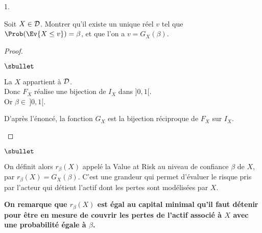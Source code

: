\documentclass[11pt]{article}%
\begin{document}
\begin{noliste}{1.}
  \setlength{\itemsep}{4mm}
  \item Soit $X \in {\cal D}$. Montrer qu'il existe un unique réel 
  $v$ tel que $\Prob(\Ev{X \leq v})=\beta$, et que l'on a 
  $v=G_X(\beta)$.
  
  \begin{proof}~
    \begin{noliste}{$\sbullet$}
      \item La \var $X$ appartient à ${\cal D}$.\\
      Donc $F_X$ réalise une bijection de $I_X$ dans $]0,1[$.\\
      Or $\beta \in \ ]0,1[$.
      
      \item D'après l'énoncé, la fonction $G_X$ est la
      bijection réciproque de $F_X$ sur $I_X$.
      ~\\[-1.4cm]
    \end{noliste}
  \end{proof}

\end{noliste}

\begin{noliste}{$\sbullet$}
  \item On définit alors $r_\beta(X)$ appelé la \og Value at 
  Risk \fg au niveau de confiance $\beta$ de $X$, par 
  $r_\beta(X)=G_X(\beta)$. C'est une grandeur qui permet d'évaluer 
  le risque pris par l'acteur qui détient l'actif dont les pertes 
  sont modélisées par $X$.
  
  \item {\bf On remarque que $r_\beta(X)$ est égal au 
  capital minimal qu'il faut détenir pour être en mesure de 
  couvrir les pertes de l'actif associé à $X$ avec une probabilité 
  égale à $\beta$.}
\end{noliste}
\end{document}
